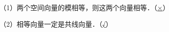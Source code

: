\documentclass[fontset=none]{ctexart}
\begin{document}
\hsize=86.26mm
\noindent\mbox{（1）}两个空间向量的模相等，则这两个向量相等．\hfill\null{}\hfill\mbox{（\underline{×}）}\hspace*{5.4mm}\par
\noindent\mbox{（2）}相等向量一定是共线向量．\hfill\null{}\hfill\mbox{（\underline{√}）}\hspace*{5.4mm}\par
\end{document}
